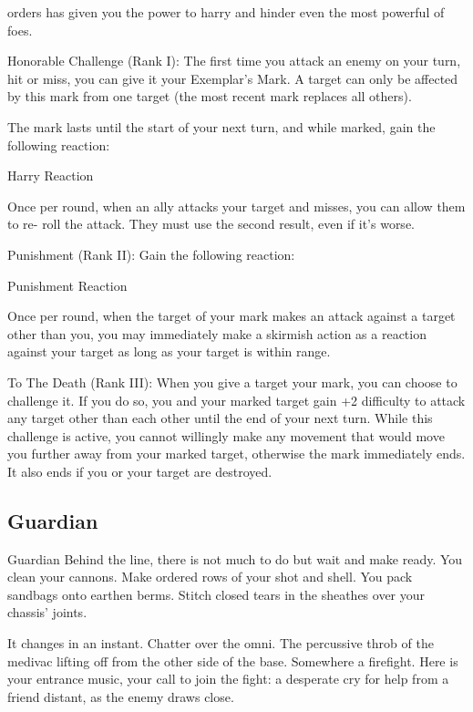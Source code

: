 orders has given you the power to harry and hinder even the most powerful of foes.  

Honorable Challenge (Rank I): The first time you attack an enemy on your turn, hit or miss, you  
can give it your Exemplar’s Mark. A target can only be affected by this mark from one target (the  
most recent mark replaces all others).
 
The mark lasts until the start of your next turn, and while marked, gain the following reaction:
 
         Harry  
         Reaction
 
         Once per round, when an ally attacks your target and misses, you can allow them to re- 
         roll the attack. They must use the second result, even if it’s worse.
 
Punishment (Rank II): Gain the following reaction:
 
	        Punishment  
	        Reaction
 
         Once per round, when the target of your mark makes an attack against a target other than  
         you, you may immediately make a skirmish action as a reaction against your target as  
         long as your target is within range.
 
To The Death (Rank III): When you give a target your mark, you can choose to challenge it. If  
you do so, you and your marked target gain +2 difficulty to attack any target other than each  
other until the end of your next turn. While this challenge is active, you cannot willingly make any  
movement that would move you further away from your marked target, otherwise the mark  
immediately ends. It also ends if you or your target are destroyed.
 

                                                                                                                
\subsection{Guardian}


                                                    Guardian  
Behind the line, there is not much to do but wait and make ready. You clean your cannons. Make  
ordered rows of your shot and shell. You pack sandbags onto earthen berms. Stitch closed tears  
in the sheathes over your chassis’ joints.   

It changes in an instant. Chatter over the omni. The percussive throb of the medivac lifting off  
from the other side of the base. Somewhere a firefight. Here is your entrance music, your call to  
join the fight: a desperate cry for help from a friend distant, as the enemy draws close.   

